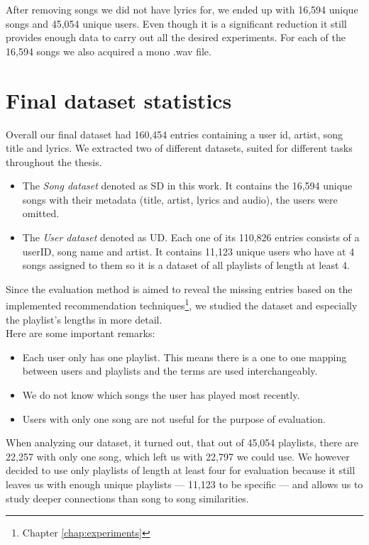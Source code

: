 After removing songs we did not have lyrics for, we ended up with 16,594 unique songs and 45,054 unique users. Even though it is a significant reduction it still provides enough data to carry out all the desired experiments. For each of the 16,594 songs we also acquired a mono .wav
file. 

\section{Final dataset statistics}
Overall our final dataset had 160,454 entries containing a user id, artist, song title and lyrics. We extracted two of different datasets, suited for different tasks throughout the thesis.
\begin{itemize}
    \item The \textit{Song dataset} denoted as SD in this work. It contains the
    16,594 unique songs with their metadata (title, artist, lyrics and audio), the users were omitted.
    \item The \textit{User dataset} denoted as UD.  Each one of its 110,826 entries consists of a userID, song name and artist. It contains 11,123 unique users who have at 4 songs assigned to them so it is a dataset of all playlists of length at least 4.
\end{itemize}
 Since the evaluation method is aimed to reveal the missing entries based on the
 implemented recommendation techniques\footnote{Chapter \ref{chap:experiments}}, we studied the dataset and especially the playlist's
 lengths in more detail. \\
 
Here are some important remarks:
\begin{itemize}
    \item Each user only has one playlist. This means there is a one to one mapping between users and playlists and the terms are used interchangeably.
    \item We do not know which songs the user has played most recently.
    \item Users with only one song are not useful for the purpose of evaluation.
\end{itemize} 
When analyzing our dataset, it turned out, that out of 45,054 playlists, there are 22,257 with only one song, which left us with 22,797 we could use. We however decided to use only playlists of length at least four for evaluation because it still leaves us with enough unique playlists --- 11,123 to be specific --- and allows us to study deeper connections than song to song similarities. 

